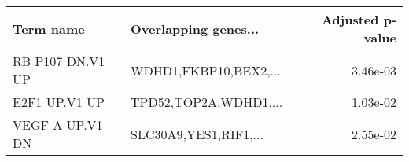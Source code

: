 \begin{tabular}{llr}
\toprule
       Term name &  Overlapping genes... &  Adjusted p-value \\
\midrule
RB P107 DN.V1 UP & WDHD1,FKBP10,BEX2,... &          3.46e-03 \\
   E2F1 UP.V1 UP & TPD52,TOP2A,WDHD1,... &          1.03e-02 \\
 VEGF A UP.V1 DN & SLC30A9,YES1,RIF1,... &          2.55e-02 \\
\bottomrule
\end{tabular}
